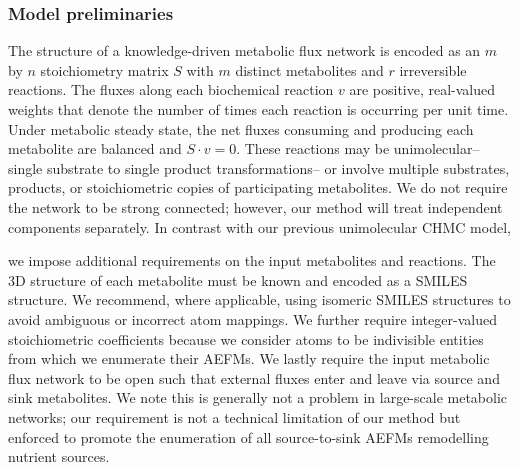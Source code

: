 \documentclass[12pt]{article}
\begin{document}
\iffalse

\subsubsection*{Model preliminaries}

The structure of a knowledge-driven metabolic flux network is encoded as
an $m$ by $n$ stoichiometry matrix $S$ with $m$ distinct metabolites and
$r$ irreversible reactions. The fluxes along each biochemical reaction $v$ are
positive, real-valued weights that denote the number of times each
reaction is occurring per unit time. Under metabolic steady state, the net
fluxes consuming and producing each metabolite are balanced and $S \cdot
v = 0$. These reactions may be unimolecular--single substrate to single
product transformations-- or involve multiple substrates, products, or
stoichiometric copies of participating metabolites. We do not require the
network to be strong connected; however, our method will treat independent
components separately. In contrast with our previous unimolecular CHMC
model,

we impose additional requirements on the input metabolites and reactions.
The 3D structure of each metabolite must be known and encoded as a SMILES
structure. We recommend, where applicable, using isomeric SMILES
structures to avoid ambiguous or incorrect atom mappings. We further
require integer-valued stoichiometric coefficients because we consider
atoms to be indivisible entities from which we enumerate their AEFMs. We
lastly require the input metabolic flux network to be open such that
external fluxes enter and leave via source and sink metabolites. We note
this is generally not a problem in large-scale metabolic networks; our
requirement is not a technical limitation of our method but enforced to
promote the enumeration of all source-to-sink AEFMs remodelling nutrient
sources.

\end{document}
